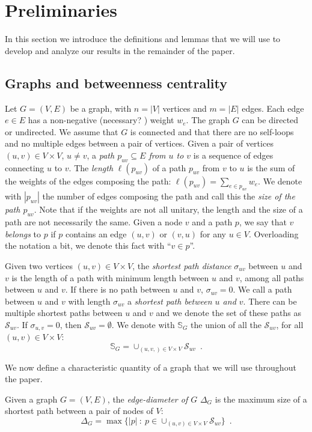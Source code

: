 \section{Preliminaries}\label{sec:prelims}
In this section we introduce the definitions and lemmas that we will use to
develop and analyze our results in the remainder of the paper.

\subsection{Graphs and betweenness centrality}\label{sec:graphprelims}
Let $G=(V,E)$ be a graph, with $n=|V|$ vertices and $m=|E|$ edges. Each edge
$e\in E$ has a non-negative (\XXX necessary?
\MR) weight $w_e$. The graph $G$ can be directed or undirected. We assume
that $G$ is connected and that there are no self-loops and no multiple edges
between a pair of vertices. Given a pair of vertices $(u,v)\in V\times V$,
$u\neq v$, a \emph{path $p_{uv}\subseteq E$ from $u$ to $v$} is a sequence of
edges connecting $u$ to $v$. The \emph{length} $\ell(p_{uv})$ of a path $p_{uv}$
from $v$ to $u$ is the sum of the weights of the edges composing the path:
$\ell(p_{uv})=\sum_{e\in p_{uv}} w_e$. We denote with $|p_{uv}|$ the number of
edges composing the path and call this the \emph{size of the path $p_{uv}$}. Note
that if the weights are not all unitary, the length and the size of a path are
not necessarily the same. Given a node $v$ and a path $p$, we say  that $v$
\emph{belongs} to $p$ if $p$ contains an edge $(u,v)$ or $(v,u)$ for any $u\in V$.
Overloading the notation a bit, we denote this fact with ``$v\in p$''.

Given two vertices $(u,v)\in V\times V$, the \emph{shortest path distance}
$\sigma_{uv}$ between $u$ and $v$ is the length of a path with minimum length
between $u$ and $v$, among all paths between $u$ and $v$. If there is no path
between $u$ and $v$, $\sigma_{uv}=0$. We call a path between $u$ and $v$ with
length $\sigma_{uv}$ a \emph{shortest path between $u$ and $v$}. There can be
multiple shortest paths between $u$ and $v$ and we denote the set of these paths
as $\mathcal{S}_{uv}$. If $\sigma_{u,v}=0$, then $\mathcal{S}_{uv}=\emptyset$.
We denote with $\mathbb{S}_G$ the union of all the $\mathcal{S}_{uv}$, for all
$(u,v)\in V\times V$: 
\[ \mathbb{S}_G=\cup_{(u,v,)\in V\times V}\mathcal{S}_{uv}\enspace.\]

We now define a characteristic quantity of a graph that we will use throughout
the paper.
\begin{definition}\label{def:edgediam}
  Given a graph $G=(V,E)$, the \emph{edge-diameter of $G$} $\Delta_G$ is the
  maximum size of a shortest path between a pair of nodes of $V$:
  \[
  \Delta_G = \max\{|p| ~:~ p\in \cup_{(u,v)\in V\times
  V}\mathcal{S}_{uv}\}\enspace.\]
\end{definition}

